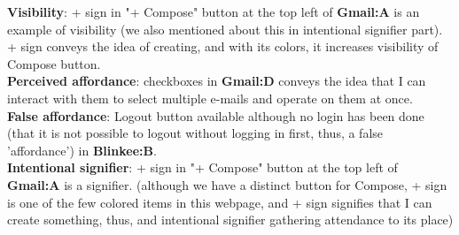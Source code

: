 \documentclass[a4paper,11pt,oneside]{scrreprt}
\begin{document}
%	
%	

\bigskip

\bigskip

\textbf{Visibility}: + sign in "+ Compose" button at the top left of  \textbf{Gmail:A} is an example of visibility (we also mentioned about this in intentional signifier part). + sign conveys the idea of creating, and with its colors, it increases visibility of Compose button.\\


\textbf{Perceived affordance}: checkboxes in \textbf{Gmail:D} conveys the idea that I can interact with them to select multiple e-mails and operate on them at once.\\

\textbf{False affordance}: Logout button available although no login has been done (that it is not possible to logout without logging in first, thus, a false 'affordance') in \textbf{Blinkee:B}.\\



\textbf{Intentional signifier}: + sign in "+ Compose" button at the top left of  \textbf{Gmail:A} is a signifier. (although we have a distinct button for Compose, + sign is one of the few colored items in this webpage, and + sign signifies that I can create something, thus, and intentional signifier gathering attendance to its place)\\
\end{document}
